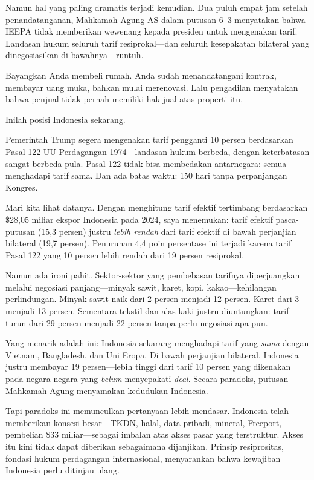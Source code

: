 \documentclass[12pt,a4paper]{article}
\begin{document}
Namun hal yang paling dramatis terjadi kemudian. Dua puluh empat jam setelah penandatanganan, Mahkamah Agung AS dalam putusan 6--3 menyatakan bahwa IEEPA tidak memberikan wewenang kepada presiden untuk mengenakan tarif. Landasan hukum seluruh tarif resiprokal---dan seluruh kesepakatan bilateral yang dinegosiasikan di bawahnya---runtuh.

Bayangkan Anda membeli rumah. Anda sudah menandatangani kontrak, membayar uang muka, bahkan mulai merenovasi. Lalu pengadilan menyatakan bahwa penjual tidak pernah memiliki hak jual atas properti itu.

Inilah posisi Indonesia sekarang.

Pemerintah Trump segera mengenakan tarif pengganti 10 persen berdasarkan Pasal 122 UU Perdagangan 1974---landasan hukum berbeda, dengan keterbatasan sangat berbeda pula. Pasal 122 tidak bisa membedakan antarnegara: semua menghadapi tarif sama. Dan ada batas waktu: 150 hari tanpa perpanjangan Kongres.

Mari kita lihat datanya. Dengan menghitung tarif efektif tertimbang berdasarkan \$28,05 miliar ekspor Indonesia pada 2024, saya menemukan: tarif efektif pasca-putusan (15,3 persen) justru \textit{lebih rendah} dari tarif efektif di bawah perjanjian bilateral (19,7 persen). Penurunan 4,4 poin persentase ini terjadi karena tarif Pasal 122 yang 10 persen lebih rendah dari 19 persen resiprokal.

Namun ada ironi pahit. Sektor-sektor yang pembebasan tarifnya diperjuangkan melalui negosiasi panjang---minyak sawit, karet, kopi, kakao---kehilangan perlindungan. Minyak sawit naik dari 2 persen menjadi 12 persen. Karet dari 3 menjadi 13 persen. Sementara tekstil dan alas kaki justru diuntungkan: tarif turun dari 29 persen menjadi 22 persen tanpa perlu negosiasi apa pun.

Yang menarik adalah ini: Indonesia sekarang menghadapi tarif yang \textit{sama} dengan Vietnam, Bangladesh, dan Uni Eropa. Di bawah perjanjian bilateral, Indonesia justru membayar 19 persen---lebih tinggi dari tarif 10 persen yang dikenakan pada negara-negara yang \textit{belum} menyepakati \textit{deal}. Secara paradoks, putusan Mahkamah Agung menyamakan kedudukan Indonesia.

Tapi paradoks ini memunculkan pertanyaan lebih mendasar. Indonesia telah memberikan konsesi besar---TKDN, halal, data pribadi, mineral, Freeport, pembelian \$33 miliar---sebagai imbalan atas akses pasar yang terstruktur. Akses itu kini tidak dapat diberikan sebagaimana dijanjikan. Prinsip resiprositas, fondasi hukum perdagangan internasional, menyarankan bahwa kewajiban Indonesia perlu ditinjau ulang.
\end{document}
